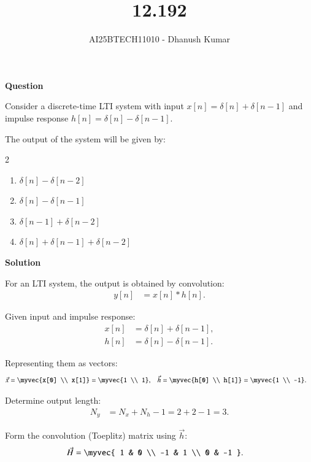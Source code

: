 \documentclass[journal]{IEEEtran}
\begin{document}
\title{12.192}
\author{AI25BTECH11010 - Dhanush Kumar}
\maketitle
\renewcommand{\thefigure}{\theenumi}
\renewcommand{\thetable}{\theenumi}

\textbf{Question}

Consider a discrete-time LTI system with input  
$x[n] = \delta[n] + \delta[n - 1]$  
and impulse response  
$h[n] = \delta[n] - \delta[n - 1]$.  

The output of the system will be given by:
\begin{multicols}{2}

\begin{enumerate}
    \item[(a)] $\delta[n] - \delta[n - 2]$
    \item[(b)] $\delta[n] - \delta[n - 1]$
    \item[(c)] $\delta[n - 1] + \delta[n - 2]$
    \item[(d)] $\delta[n] + \delta[n - 1] + \delta[n - 2]$
\end{enumerate}
\end{multicols}

\textbf{Solution}

For an LTI system, the output is obtained by convolution:
\begin{align}
y[n] &= x[n] * h[n].
\end{align}

Given input and impulse response:
\begin{align}
x[n] &= \delta[n] + \delta[n-1], \\
h[n] &= \delta[n] - \delta[n-1].
\end{align}

Representing them as vectors:
\begin{align}
\vec{x} &= 
\myvec{x[0] \\ x[1]}
= 
\myvec{1 \\ 1}, &
\vec{h} &= 
\myvec{h[0] \\ h[1]}
= 
\myvec{1 \\ -1}.
\end{align}

Determine output length:
\begin{align}
N_y &= N_x + N_h - 1 = 2 + 2 - 1 = 3.
\end{align}

Form the convolution (Toeplitz) matrix using $\vec{h}$:
\begin{align}
\vec{H} &= 
\myvec{
1 & 0 \\
-1 & 1 \\
0 & -1
}.
\end{align}
\end{document}
